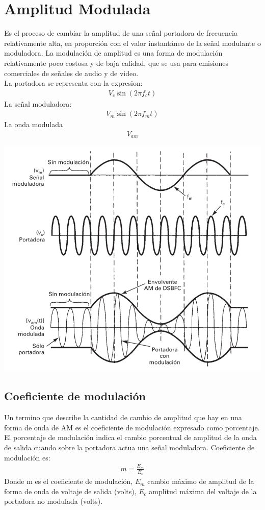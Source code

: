 \documentclass[10pt,a4paper]{article}
\begin{document}
	\section{Amplitud Modulada}
	Es el proceso de cambiar la amplitud de una señal portadora de frecuencia relativamente alta, en proporción con el valor instantáneo de la señal modulante o moduladora. La modulación de amplitud es una forma de modulación relativamente poco costosa y de baja calidad, que se usa para emisiones comerciales de señales de audio y de video.
	\\
	La portadora se representa con la expresion:
	\begin{align}
	V_c\sin(2\pi f_c t)
	\end{align}
	La señal moduladora:
	\begin{align}
		V_m\sin (2\pi f_m t)
	\end{align}
	La onda modulada
	\begin{align}
		V_{am}
	\end{align}
	\begin{center}
		\includegraphics[scale=0.5]{screenshot001}
	\end{center}
	\subsection{Coeficiente de modulación}
	Un termino que describe la cantidad de cambio de amplitud que hay en una forma de onda de AM es el coeficiente de modulación expresado como porcentaje. El porcentaje de modulación indica el cambio porcentual de amplitud de la onda de salida cuando sobre la portadora actua una señal moduladora. Coeficiente de modulación es:
	\begin{align}
		m=\frac{E_m}{E_c}
	\end{align}
	Donde m es el coeficiente de modulación, $E_m$ cambio máximo de amplitud de la forma de onda de voltaje de salida (volts), $E_c$ amplitud máxima del voltaje de la portadora no modulada (volts).
\end{document}
